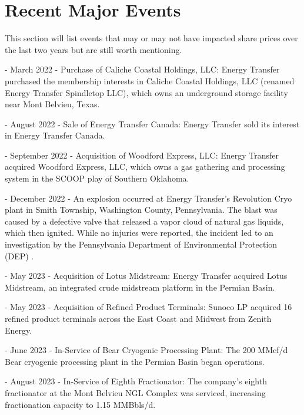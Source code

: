 \documentclass[9pt,a4paper,twoside]{tau}
\begin{document}
\section{Recent Major Events}
    
    This section will list events that may or may not have impacted share prices over the last two years but are still worth mentioning. 

    - March 2022 - Purchase of Caliche Coastal Holdings, LLC: Energy Transfer purchased the membership interests in Caliche Coastal Holdings, LLC (renamed Energy Transfer Spindletop LLC), which owns an underground storage facility near Mont Belvieu, Texas\cite{energy-transfer-2023}.

    - August 2022 - Sale of Energy Transfer Canada: Energy Transfer sold its interest in Energy Transfer Canada\cite{energy-transfer-2023}.
    
    - September 2022 - Acquisition of Woodford Express, LLC: Energy Transfer acquired Woodford Express, LLC, which owns a gas gathering and processing system in the SCOOP play of Southern Oklahoma\cite{energy-transfer-2023}.
    
    - December 2022 - An explosion occurred at Energy Transfer's Revolution Cryo plant in Smith Township, Washington County, Pennsylvania. The blast was caused by a defective valve that released a vapor cloud of natural gas liquids, which then ignited. While no injuries were reported, the incident led to an investigation by the Pennsylvania Department of Environmental Protection (DEP) \cite{commonwealth-of-pennsylvania-department-of-environmental-protection-air-quality-program-2023} \cite{energy-transfer-2024}.

    - May 2023 - Acquisition of Lotus Midstream: Energy Transfer acquired Lotus Midstream, an integrated crude midstream platform in the Permian Basin\cite{energy-transfer-2024}.
    
    - May 2023 - Acquisition of Refined Product Terminals: Sunoco LP acquired 16 refined product terminals across the East Coast and Midwest from Zenith Energy\cite{energy-transfer-2024}.
    
    - June 2023 - In-Service of Bear Cryogenic Processing Plant: The 200 MMcf/d Bear cryogenic processing plant in the Permian Basin began operations\cite{energy-transfer-2024}.
    
    - August 2023 - In-Service of Eighth Fractionator: The company's eighth fractionator at the Mont Belvieu NGL Complex was serviced, increasing fractionation capacity to 1.15 MMBbls/d\cite{energy-transfer-2024}.
    
\end{document}
